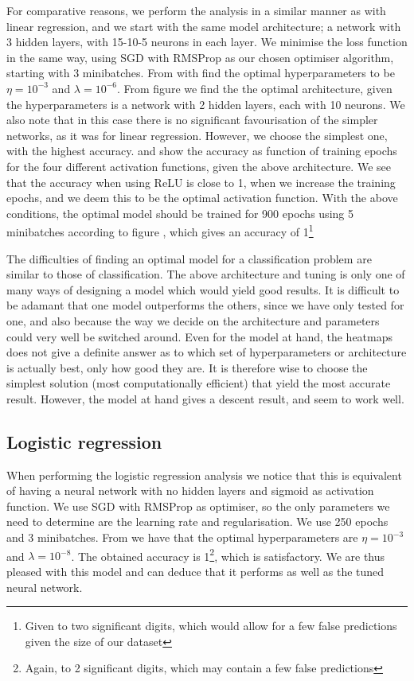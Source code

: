     For comparative reasons, we perform the analysis in a similar manner as with linear regression, and we start with the same model architecture; a network with 3 hidden layers, with 15-10-5 neurons in each layer. We minimise the loss function in the same way, using SGD with RMSProp as our chosen optimiser algorithm, starting with 3 minibatches. From  with find the optimal hyperparameters to be $\eta=10^{-3}$ and $\lambda=10^{-6}$. From figure  we find the the optimal architecture, given the hyperparameters is a network with 2 hidden layers, each with 10 neurons. We also note that in this case there is no significant favourisation of the simpler networks, as it was for linear regression. However, we choose the simplest one, with the highest accuracy.  and  show the accuracy as function of training epochs for the four different activation functions, given the above architecture. We see that the accuracy when using ReLU is close to 1, when we increase the training epochs, and we deem this to be the optimal activation function. With the above conditions, the optimal model should be trained for 900 epochs using 5 minibatches according to figure , which gives an accuracy of 1\footnote{Given to two significant digits, which would allow for a few false predictions given the size of our dataset} 

    The difficulties of finding an optimal model for a classification problem are similar to those of classification. The above architecture and tuning is only one of many ways of designing a model which would yield good results. It is difficult to be adamant that one model outperforms the others, since we have only tested for one, and also because the way we decide on the architecture and parameters could very well be switched around. Even for the model at hand, the heatmaps does not give a definite answer as to which set of hyperparameters or architecture is actually best, only how good they are. It is therefore wise to choose the simplest solution  (most computationally efficient) that yield the most accurate result. However, the model at hand gives a descent result, and seem to work well.

\subsection{Logistic regression}\label{sec:analysis_logistic_regression}
    When performing the logistic regression analysis we notice that this is equivalent of having a neural network with no hidden layers and sigmoid as activation function. We use SGD with RMSProp as optimiser, so the only parameters we need to determine are the learning rate and regularisation. We use 250 epochs and 3 minibatches. From  we have that the optimal hyperparameters are $\eta=10^{-3}$ and $\lambda = 10^{-8}$. The obtained accuracy is 1\footnote{Again, to 2 significant digits, which may contain a few false predictions}, which is satisfactory. We are thus pleased with this model and can deduce that it performs as well as the tuned neural network. 
